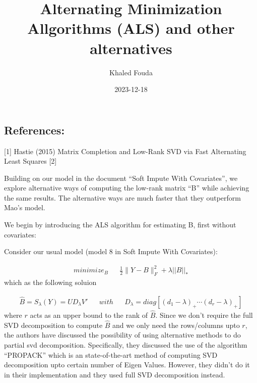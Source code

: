\documentclass[
]{article}
\title{Alternating Minimization Allgorithms (ALS) and other
alternatives}
\author{Khaled Fouda}
\date{2023-12-18}
\newenvironment{Shaded}{\begin{snugshade}}{\end{snugshade}}
\newcommand{\AttributeTok}[1]{\textcolor[rgb]{0.77,0.63,0.00}{#1}}
\newcommand{\ConstantTok}[1]{\textcolor[rgb]{0.00,0.00,0.00}{#1}}
\newcommand{\FunctionTok}[1]{\textcolor[rgb]{0.00,0.00,0.00}{#1}}
\newcommand{\NormalTok}[1]{#1}
\newcommand{\SpecialCharTok}[1]{\textcolor[rgb]{0.00,0.00,0.00}{#1}}
\newcommand{\StringTok}[1]{\textcolor[rgb]{0.31,0.60,0.02}{#1}}
\begin{document}
\maketitle

\begin{Shaded}
\end{Shaded}

\hypertarget{references}{%
\subsection{References:}\label{references}}

{[}1{]} Hastie (2015) Matrix Completion and Low-Rank SVD via Fast
Alternating Least Squares {[}2{]}

Building on our model in the document ``Soft Impute With Covariates'',
we explore alternative ways of computing the low-rank matrix ``B'' while
achieving the same results. The alternative ways are much faster that
they outperform Mao's model.

We begin by introducing the ALS algorithm for estimating B, first
without covariates:

Consider our usual model (model 8 in Soft Impute With Covariates):

\[
\begin{aligned}
minimize_B && \frac{1}{2} \|Y-B\|^2_F + \lambda ||B||_*
\end{aligned}
\] which as the following soluion

\[
\begin{aligned}
\hat{B} = S_\lambda(Y) = U D_\lambda V'&& with && D_\lambda = diag[(d_1-\lambda)_+\cdots(d_r-\lambda)_+]
\end{aligned}
\] where \(r\) acts as an upper bound to the rank of \(\hat{B}\). Since
we don't require the full SVD decomposition to compute \(\hat{B}\) and
we only need the rows/columns upto \(r\), the authors have discussed the
possibility of using alternative methods to do partial svd
decomposition. Specifically, they discussed the use of the algorithm
``PROPACK'' which is an state-of-the-art method of computing SVD
decomposition upto certain number of Eigen Values. However, they didn't
do it in their implementation and they used full SVD decomposition
instead.
\end{document}
